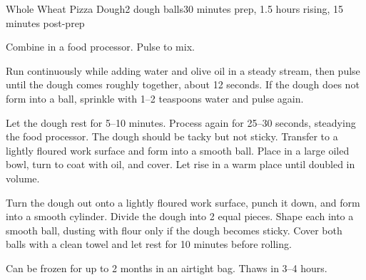 \documentclass[../Cookbook.tex]{subfiles}
\begin{document}
\begin{recipe}[PizzaDough]{Whole Wheat Pizza Dough}{2 dough balls}{30 minutes prep, 1.5 hours rising, 15 minutes post-prep}

Combine in a food processor. Pulse to mix.

Run continuously while adding water and olive oil in a steady stream, then pulse until the dough comes roughly together, about 12 seconds. If the dough does not form into a ball, sprinkle with 1--2 teaspoons water and pulse again.

\newstep
Let the dough rest for 5--10 minutes. Process again for 25--30 seconds, steadying the food processor. The dough should be tacky but not sticky. Transfer to a lightly floured work surface and form into a smooth ball.
Place in a large oiled bowl, turn to coat with oil, and cover.
Let rise in a warm place until doubled in volume.

\newstep
Turn the dough out onto a lightly floured work surface, punch it down, and form into a smooth cylinder. Divide the dough into 2 equal pieces. Shape each into a smooth ball, dusting with flour only if the dough becomes sticky. Cover both balls with a clean towel and let rest for 10 minutes before rolling.



Can be frozen for up to 2 months in an airtight bag. Thaws in 3--4 hours.

\end{recipe}
\end{document}
